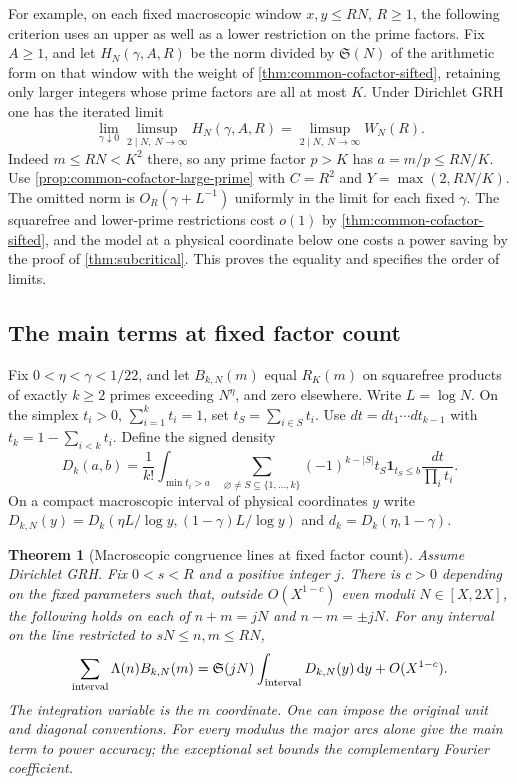 \documentclass[11pt,a4paper]{article}
\numberwithin{equation}{section}
\newtheorem{theorem}{Theorem}[section]
\newcommand{\SSS}{\mathfrak S}
\newcommand{\ud}{\mathrm d}
\begin{document}
For example, on each fixed macroscopic window $x,y\le RN$,
$R\ge1$, the following criterion uses an upper as well as a
lower restriction on the prime factors. Fix $A\ge1$, and let
$H_N(\gamma,A,R)$ be the norm divided by $\SSS(N)$ of the
arithmetic form on that window with the weight of
\cref{thm:common-cofactor-sifted}, retaining only larger
integers whose prime factors are all at most $K$. Under
Dirichlet GRH one has the iterated limit
\begin{equation}
 \lim_{\gamma\downarrow0}\limsup_{2\mid N,\ N\to\infty}
 H_N(\gamma,A,R)
     =\limsup_{2\mid N,\ N\to\infty} W_N(R).
 \label{eq:macroscopic-sifted-cofactor-limit}
\end{equation}
Indeed $m\le RN<K^2$ there, so any prime factor $p>K$
has $a=m/p\le RN/K$. Use \cref{prop:common-cofactor-large-prime}
with $C=R^2$ and $Y=\max(2,RN/K)$. The omitted norm is
$O_R(\gamma+L^{-1})$ uniformly in the limit for each fixed
$\gamma$. The squarefree and lower-prime restrictions cost
$o(1)$ by \cref{thm:common-cofactor-sifted}, and the model at
a physical coordinate below one costs a power saving by the proof
of \cref{thm:subcritical}. This proves the equality and specifies
the order of limits.

\subsection{The main terms at fixed factor count}

Fix $0<\eta<\gamma<1/22$, and let $B_{k,N}(m)$ equal $R_K(m)$
on squarefree products of exactly $k\ge2$ primes exceeding
$N^\eta$, and zero elsewhere. Write $L=\log N$. On the simplex
$t_i>0$, $\sum_{i=1}^k t_i=1$, set $t_S=\sum_{i\in S}t_i$.
Use $dt=dt_1\cdots dt_{k-1}$ with $t_k=1-\sum_{i<k}t_i$.
Define the signed density
\begin{equation}
 D_k(a,b)=\frac1{k!}\int_{\min t_i>a}
     \sum_{\varnothing\ne S\subseteq\{1,\ldots,k\}}
        (-1)^{k-|S|} t_S\mathbf1_{t_S\le b}
            \frac{dt}{\prod_i t_i}.
 \label{eq:cofactor-sector-density}
\end{equation}
On a compact macroscopic interval of physical coordinates $y$
write $D_{k,N}(y)=D_k(\eta L/\log y,(1-\gamma)L/\log y)$
and $d_k=D_k(\eta,1-\gamma)$.

\begin{theorem}[Macroscopic congruence lines at fixed factor count]
\label{thm:cofactor-sector-lines}
Assume Dirichlet GRH. Fix $0<s<R$ and a positive integer $j$.
There is $c>0$ depending on the fixed parameters such that,
outside $O(X^{1-c})$ even moduli $N\in[X,2X]$, the following
holds on each of $n+m=jN$ and $n-m=\pm jN$. For any interval
on the line restricted to $sN\le n,m\le RN$,
\begin{equation}
 \sum_{\rm interval}\Lambda(n) B_{k,N}(m)
 =\SSS(jN)\int_{\rm interval}D_{k,N}(y)\,\ud y
                      +O(X^{1-c}).
 \label{eq:cofactor-sector-line}
\end{equation}
The integration variable is the $m$ coordinate. One can impose
the original unit and diagonal conventions. For every modulus
the major arcs alone give the main term to power accuracy;
the exceptional set bounds the complementary Fourier coefficient.
\end{theorem}
\end{document}
